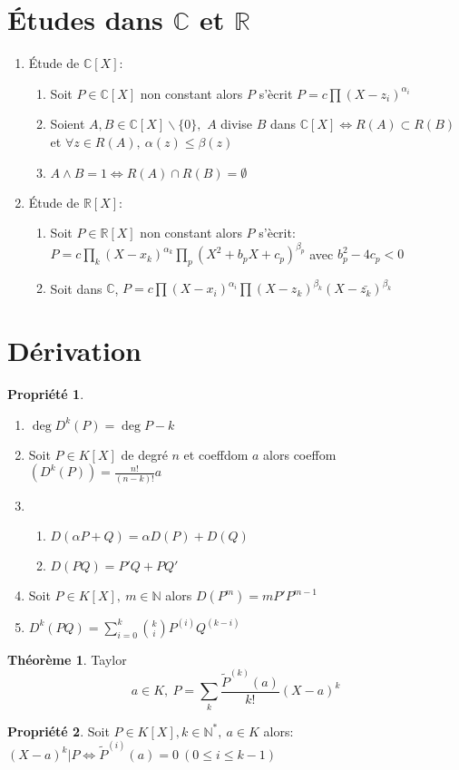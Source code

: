 \documentclass[fleqn]{article}
\theoremstyle{definition} \newtheorem*{defi}{D\'efinition}
\theoremstyle{definition} \newtheorem*{theo}{Th\'eor\`eme}
\theoremstyle{definition} \newtheorem*{coro}{Corollaire}
\theoremstyle{definition} \newtheorem*{nota}{Notation}
\theoremstyle{remark} \newtheorem*{rqs}{Remarques}
\theoremstyle{definition} \newtheorem*{prop}{Propri\'et\'e}
\begin{document}
\section{\'Etudes dans $\mathbb{C}$ et $\mathbb{R}$}
\begin{enumerate}
	\item \'Etude de $\mathbb{C}[X]$:
		\begin{enumerate}
			\item Soit $P \in \mathbb{C}[X]$ non constant alors $P$ s'\`ecrit $P = c\prod (X-z_i)^{\alpha_i}$
			\item Soient $A,B \in \mathbb{C}[X]\backslash \{0\},$ $A$ divise $B$ dans $\mathbb{C}[X] \Leftrightarrow R(A) \subset R(B)$ et
				$\forall z \in R(A),\ \alpha(z) \leq \beta(z)$
			\item $A \land B = 1 \Leftrightarrow R(A) \cap R(B) = \emptyset$
		\end{enumerate}
	\item \'Etude de $\mathbb{R}[X]$:
		\begin{enumerate}
			\item Soit $P \in \mathbb{R}[X]$ non constant alors $P$ s'\`ecrit:\\ $P = c\prod_k (X - x_k)^{\alpha_k} \prod_p (X^2 + b_p X + c_p)^
				{\beta_p}$ avec $b_p^2 - 4c_p < 0$
			\item Soit dans $\mathbb{C}$, $P = c\prod(X - x_i)^{\alpha_i} \prod (X-z_k)^{\beta_k} (X-\bar{z_k})^{\beta_k}$
		\end{enumerate}
\end{enumerate}

\section{D\'erivation}
\begin{prop} $ $
	\begin{enumerate}
		\item $\deg D^k(P) = \deg P - k$
		\item Soit $P \in K[X]$ de degr\'e $n$ et coeffdom $a$ alors coeffom$(D^k(P)) = \frac{n!}{(n-k)!}a$
		\item \begin{enumerate}
			\item $D(\alpha P + Q) = \alpha D(P) + D(Q)$
			\item $D(PQ) = P'Q + PQ'$
			\end{enumerate}
		\item Soit $P \in K[X],\ m \in \mathbb{N}$ alors $D(P^m) = m P' P^{m-1}$
		\item $D^k(PQ) = \sum_{i = 0}^k \binom{k}{i}P^{(i)}Q^{(k-i)}$
	\end{enumerate}
\end{prop}
\begin{theo} Taylor
	\[a \in K,\ P = \sum_k \frac{\tilde{P}^{(k)}(a)}{k!} (X - a)^k\]
\end{theo}
\begin{prop}
	\item Soit $P \in K[X], k \in \mathbb{N}^*,\ a \in K$ alors: $(X-a)^k | P \Leftrightarrow \tilde{P}^{(i)}(a) = 0\ (0 \leq i \leq k-1)$
\end{prop}
\end{document}
